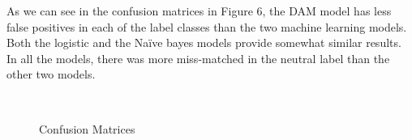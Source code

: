 \documentclass[runningheads]{llncs}
\begin{document}
As we can see in the confusion matrices in Figure 6, the DAM model has less false positives in each of the label classes than the two machine learning models. Both the logistic and the Naïve bayes models provide somewhat similar results. In all the models, there was more miss-matched in the neutral label than the other two models.

\\
\begin{figure}[ht]
	\hfill 	
	\hfill	
	\caption{Confusion Matrices }
\end{figure}
\end{document}
